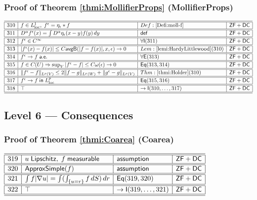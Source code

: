 \documentclass[11pt,reqno]{amsart}
\begin{document}
\medskip

\subsubsection*{Proof of Theorem \ref{thmi:MollifierProps} (\textsf{MollifierProps})}

\noindent$%
\begin{array}{|r|l|l|l|}
\hline\hline
310 & f\in L^{1}_{\mathrm{loc}},\;f^{\epsilon}=\eta_{\epsilon}*f & Def:\ref{Defi:moll-f} & \mathsf{ZF+DC} \\ \hline\hline
311 & D^{\alpha}f^{\epsilon}(x)=\int D^{\alpha}\eta_{\epsilon}(x-y)f(y)\,dy & \mathsf{def} & \mathsf{ZF+DC} \\ \hline\hline
312 & f^{\epsilon}\in C^{\infty} & \forall\mathsf{I}(311) & \mathsf{ZF+DC} \\ \hline\hline
313 & |f^{\epsilon}(x)-f(x)|\le C\mathsf{avgB}(|f-f(x)|,x,\epsilon)\to0 & Lem:\ref{lemi:HardyLittlewood}(310) & \mathsf{ZF+DC} \\ \hline\hline
314 & f^{\epsilon}\to f\;\mathsf{a.e.} & \forall\mathsf{E}(313) & \mathsf{ZF+DC} \\ \hline\hline
315 & f\in C(U)\Rightarrow\sup_{V}|f^{\epsilon}-f|\le C\omega(\epsilon)\to0 & \mathsf{Eq}(313,314) & \mathsf{ZF+DC} \\ \hline\hline
316 & \|f^{\epsilon}-f\|_{L^{p}(V)}\le2\|f-g\|_{L^{p}(W)}+\|g^{\epsilon}-g\|_{L^{p}(V)} & Thm:\ref{thmi:Holder}(310) & \mathsf{ZF+DC} \\ \hline\hline
317 & f^{\epsilon}\to f\;\mathsf{in}\;L^{p}_{\mathrm{loc}} & \mathsf{Eq}(315,316) & \mathsf{ZF+DC} \\ \hline\hline
318 & \top & \to\mathsf{I}(310,\dots,317) & \mathsf{ZF+DC} \\ \hline\hline
\end{array}%
$

\medskip

\subsection*{\textsf{Level 6 --- Consequences}}

\subsubsection*{Proof of Theorem \ref{thmi:Coarea} (\textsf{Coarea})}

\noindent$%
\begin{array}{|r|l|l|l|}
\hline\hline
319 & u\;\mathsf{Lipschitz},\;f\;\mathsf{measurable} & \mathsf{assumption} & \mathsf{ZF+DC} \\ \hline\hline
320 & \mathsf{ApproxSimple}(f) & \mathsf{assumption} & \mathsf{ZF+DC} \\ \hline\hline
321 & \int f|\nabla u|=\int(\int_{\{u=r\}}f\,dS)\,dr & \mathsf{Eq}(319,320) & \mathsf{ZF+DC} \\ \hline\hline
322 & \top & \to\mathsf{I}(319,\dots,321) & \mathsf{ZF+DC} \\ \hline\hline
\end{array}%
$
\end{document}
